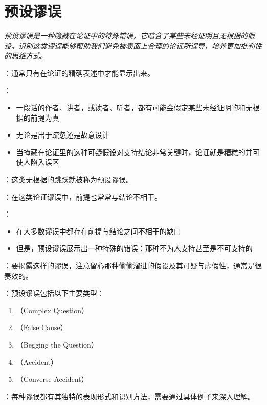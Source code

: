 \section{预设谬误}

\begin{logicbox}[title=引言]
\textit{预设谬误是一种隐藏在论证中的特殊错误，它暗含了某些未经证明且无根据的假设。识别这类谬误能够帮助我们避免被表面上合理的论证所误导，培养更加批判性的思维方式。}
\end{logicbox}

\begin{theorembox}[title=预设谬误的本质特征]
：通常只有在论证的精确表述中才能显示出来。

：
\begin{itemize}
  \item 一段话的作者、讲者，或读者、听者，都有可能会假定某些未经证明的和无根据的前提为真
  \item 无论是出于疏忽还是故意设计
  \item 当掩藏在论证里的这种可疑假设对支持结论非常关键时，论证就是糟糕的并可使人陷入误区
\end{itemize}

：这类无根据的跳跃就被称为预设谬误。
\end{theorembox}

\begin{theorembox}[title=预设谬误的特殊性]
：在这类论证谬误中，前提也常常与结论不相干。

：
\begin{itemize}
  \item 在大多数谬误中都存在前提与结论之间不相干的缺口
  \item 但是，预设谬误展示出一种特殊的错误：那种不为人支持甚至是不可支持的
\end{itemize}

：要揭露这样的谬误，注意留心那种偷偷溜进的假设及其可疑与虚假性，通常是很奏效的。
\end{theorembox}

\begin{theorembox}[title=预设谬误的主要类型]
：预设谬误包括以下主要类型：

\begin{enumerate}
  \item {}（Complex Question）
  \item {}（False Cause）
  \item {}（Begging the Question）
  \item {}（Accident）
  \item {}（Converse Accident）
\end{enumerate}

：每种谬误都有其独特的表现形式和识别方法，需要通过具体例子来深入理解。
\end{theorembox}